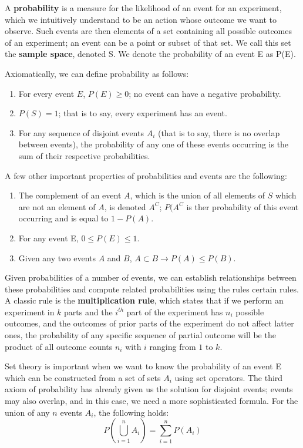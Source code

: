 A \textbf{probability} is a measure for the likelihood of an event for an
experiment, which we intuitively understand to be an action whose
outcome we want to observe. Such events are then elements of a set
containing all possible outcomes of an experiment; an event can be a
point or subset of that set. We call this set the \textbf{sample space},
denoted S. We denote the probability of an event E as P(E).

Axiomatically, we can define probability as follows:

\begin{enumerate}
\item For every event $E$, $P(E) \geq 0$; no event can have a negative probability.
\item $P(S) = 1$; that is to say, every experiment has an event.
\item For any sequence of disjoint events $A_i$ (that is to say,
  there is no overlap between events), the probability of any one of
  these events occurring is the sum of their respective probabilities.
\end{enumerate}

A few other important properties of probabilities and events are the following:

\begin{enumerate}
\item The complement of an event $A$, which is the union of all
  elements of $S$ which are not an element of $A$, is denoted $A^C$;
  $P(A^C$ is ther probability of this event occurring and is equal to $1
  - P(A)$.
\item For any event E, $0 \leq P(E) \leq 1$.
\item Given any two events $A$ and $B$, $A \subset B \rightarrow P(A) \leq P(B)$.
\end{enumerate}

Given probabilities of a number of events, we can establish
relationships between these probabilities and compute related
probabilities using the rules certain rules. A classic rule is the
\textbf{multiplication rule}, which states that if we perform an
experiment in $k$ parts and the $i^{th}$ part of the experiment has
$n_i$ possible outcomes, and the outcomes of prior parts of the
experiment do not affect latter ones, the probability of any specific
sequence of partial outcome will be the product of all outcome counts
$n_i$ with $i$ ranging from $1$ to $k$.

Set theory is important when we want to know the probability of an
event E which can be constructed from a set of sets $A_i$ using set
operators. The third axiom of probability has already given us the
solution for disjoint events; events may also overlap, and in this
case, we need a more sophisticated formula. For the union of any $n$
events $A_i$, the following holds:
\begin{equation}
  P(\bigcup_{i=1}^n A_i) = \sum\limits_{i=1}^n P(A_i)
\end{equation}

